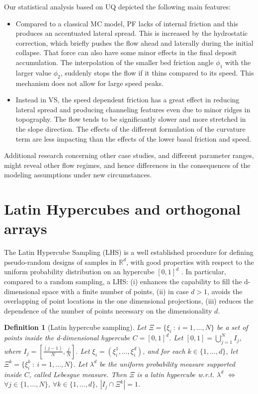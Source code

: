 \documentclass{article}
\newtheorem{definition}[theorem]{Definition}
\begin{document}
Our statistical analysis based on UQ depicted the following main features:
\begin{itemize}
  \item Compared to a classical MC model, PF lacks of internal friction and this produces an accentuated lateral spread. This is increased by the hydrostatic correction, which briefly pushes the flow ahead and laterally during the initial collapse. That force can also have some minor effects in the final deposit accumulation. The interpolation of the smaller bed friction angle $\phi_1$ with the larger value $\phi_2$, suddenly stops the flow if it thins compared to its speed. This mechanism does not allow for large speed peaks.
  \item Instead in VS, the speed dependent friction has a great effect in reducing lateral spread and producing channeling features even due to minor ridges in topography. The flow tends to be significantly slower and more stretched in the slope direction. The effects of the different formulation of the curvature term are less impacting than the effects of the lower basal friction and speed.
\end{itemize}

Additional research concerning other case studies, and different parameter ranges, might reveal other flow regimes, and hence differences in the consequences of the modeling assumptions under new circumstances.
\newpage
\appendix
\section{Latin Hypercubes and orthogonal arrays}\label{A-1}
The Latin Hypercube Sampling (LHS) is a well established procedure for defining pseudo-random designs of samples in $\mathbb R^d$, with good properties with respect to the uniform probability distribution on an hypercube $[0,1]^d$ \citep{McKay1979,Owen1992b,Stein1987,Ranjan2014,Mingyao2016}. In particular, compared to a random sampling, a LHS: (i) enhances the capability to fill the d-dimensional space with a finite number of points, (ii) in case $d>1$, avoids the overlapping of point locations in the one dimensional projections, (iii) reduces the dependence of the number of points necessary on the dimensionality $d$.

\begin{definition}[Latin hypercube sampling]
Let $\Xi=\{\xi_i\ :\ i=1,\dots,N\}$ be a set of points inside the d-dimensional hypercube $C=[0,1]^d$. Let $[0,1]=\bigcup_{j=1}^{N} I_j$, where $I_j=[\frac{(j-1)}{N},\frac{j}{N}]$. Let $\xi_i=\left(\xi_i^1,\dots,\xi_i^d\right)$, and for each $k\in\{1,\dots,d\}$, let $\Xi^k=\{\xi^k_i\ :\ i=1,\dots,N\}$. Let $\lambda^d$ be the uniform probability measure supported inside $C$, called Lebesgue measure. Then $\Xi$ is a latin hypercube w.r.t. $\lambda^d$ $\Longleftrightarrow$ $\forall j\in \{1,\dots,N\}$, $\forall k\in\{1,\dots,d\}$, $\left|I_j\cap\Xi^k\right|=1$.
\end{definition}
\end{document}
